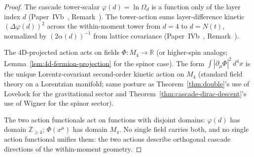 \documentclass[12pt,a4paper]{article}
\begin{document}
\begin{proof}
The cascade tower-scalar $\varphi(d) = \ln\Omega_d$ is a function
only of the layer index $d$
(Paper~IVb~\cite{part4b}, Remark~).
The tower-action sums layer-difference kinetic
$(\Delta\varphi(d))^2$ across the within-moment tower from
$d = 4$ to $d = N(t)$, normalized by $(2\alpha(d))^{-1}$ from
lattice covariance (Paper~IVb~\cite{part4b},
Remark~).

The $4$D-projected action acts on fields
$\Phi : M_4 \to \mathbb{R}$ (or higher-spin analogs;
Lemma~\ref{lem:4d-fermion-projection} for the spinor case). The
form $\int |\partial_\mu\Phi|^2\,d^4x$ is the unique
Lorentz-covariant second-order kinetic action on $M_4$ (standard
field theory on a Lorentzian manifold; same posture as
Theorem~\ref{thm:double}'s use of Lovelock for the gravitational
sector and Theorem~\ref{thm:cascade-dirac-descent}'s use of
Wigner for the spinor sector).

The two action functionals act on functions with disjoint
domains: $\varphi(d)$ has domain $\mathbb{Z}_{\geq 4}$;
$\Phi(x^\mu)$ has domain $M_4$. No single field carries both,
and no single action functional unifies them: the two actions
describe orthogonal cascade directions of the within-moment
geometry.
\end{proof}
\end{document}
